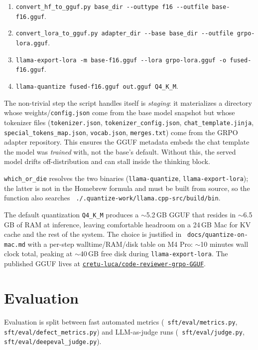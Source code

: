 \documentclass[11pt,a4paper]{article}
\newcommand{\code}[1]{\texttt{\small #1}}
\renewcommand{\path}[1]{\texttt{\small\color{mute} #1}}
\begin{document}
\begin{enumerate}[leftmargin=*]
  \item \code{convert\_hf\_to\_gguf.py base\_dir \texttt{-{}-}outtype f16
        \texttt{-{}-}outfile base-f16.gguf}.
  \item \code{convert\_lora\_to\_gguf.py adapter\_dir \texttt{-{}-}base
        base\_dir \texttt{-{}-}outfile grpo-lora.gguf}.
  \item \code{llama-export-lora -m base-f16.gguf \texttt{-{}-}lora
        grpo-lora.gguf -o fused-f16.gguf}.
  \item \code{llama-quantize fused-f16.gguf out.gguf Q4\_K\_M}.
\end{enumerate}

The non-trivial step the script handles itself is \emph{staging}: it
materializes a directory whose weights/\code{config.json} come from the
base model snapshot but whose tokenizer files
(\code{tokenizer.json}, \code{tokenizer\_config.json},
\code{chat\_template.jinja}, \code{special\_tokens\_map.json},
\code{vocab.json}, \code{merges.txt}) come from the GRPO adapter
repository. This ensures the GGUF metadata embeds the chat template the
model was \emph{trained} with, not the base's default. Without this, the
served model drifts off-distribution and can stall inside the thinking
block.

\code{which\_or\_die} resolves the two binaries (\code{llama-quantize},
\code{llama-export-lora}); the latter is not in the Homebrew formula and
must be built from source, so the function also searches
\path{./.quantize-work/llama.cpp-src/build/bin}.

The default quantization \code{Q4\_K\_M} produces a $\sim$5.2\,GB GGUF
that resides in $\sim$6.5\,GB of RAM at inference, leaving comfortable
headroom on a 24\,GB Mac for KV cache and the rest of the system. The
choice is justified in \path{docs/quantize-on-mac.md} with a per-step
walltime/RAM/disk table on M4 Pro: $\sim$10 minutes wall clock total,
peaking at $\sim$40\,GB free disk during \code{llama-export-lora}. The
published GGUF lives at
\href{https://huggingface.co/cretu-luca/code-reviewer-grpo-GGUF}%
{\code{cretu-luca/code-reviewer-grpo-GGUF}}.

\section{Evaluation}

Evaluation is split between fast automated metrics
(\path{sft/eval/metrics.py}, \path{sft/eval/defect\_metrics.py}) and
LLM-as-judge runs (\path{sft/eval/judge.py},
\path{sft/eval/deepeval\_judge.py}).
\end{document}
